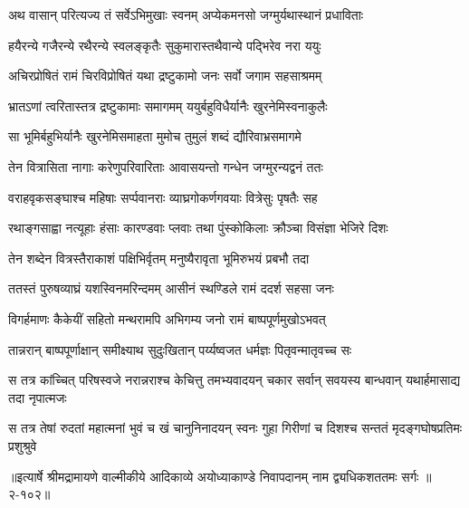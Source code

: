 \twolineshloka
{अथ वासान् परित्यज्य तं सर्वेऽभिमुखाः स्वनम्}
{अप्येकमनसो जग्मुर्यथास्थानं प्रधाविताः} %

\twolineshloka
{हयैरन्ये गजैरन्ये रथैरन्ये स्वलङ्कृतैः}
{सुकुमारास्तथैवान्ये पद्भिरेव नरा ययुः} %

\twolineshloka
{अचिरप्रोषितं रामं चिरविप्रोषितं यथा}
{द्रष्टुकामो जनः सर्वो जगाम सहसाश्रमम्} %

\twolineshloka
{भ्रातऽणां त्वरितास्तत्र द्रष्टुकामाः समागमम्}
{ययुर्बहुविधैर्यानैः खुरनेमिस्वनाकुलैः} %

\twolineshloka
{सा भूमिर्बहुभिर्यानैः खुरनेमिसमाहता}
{मुमोच तुमुलं शब्दं द्यौरिवाभ्रसमागमे} %

\twolineshloka
{तेन वित्रासिता नागाः करेणुपरिवारिताः}
{आवासयन्तो गन्धेन जग्मुरन्यद्वनं ततः} %

\twolineshloka
{वराहवृकसङ्घाश्च महिषाः सर्प्पवानराः}
{व्याघ्रगोकर्णगवयाः वित्रेसुः पृषतैः सह} %

\twolineshloka
{रथाङ्गसाह्वा नत्यूहाः हंसाः कारण्डवाः प्लवाः}
{तथा पुंस्कोकिलाः क्रौञ्चा विसंज्ञा भेजिरे दिशः} %

\twolineshloka
{तेन शब्देन वित्रस्तैराकाशं पक्षिभिर्वृतम्}
{मनुष्यैरावृता भूमिरुभयं प्रबभौ तदा} %

\twolineshloka
{ततस्तं पुरुषव्याघ्रं यशस्विनमरिन्दमम्}
{आसीनं स्थण्डिले रामं ददर्श सहसा जनः} %

\twolineshloka
{विगर्हमाणः कैकेयीं सहितो मन्थरामपि}
{अभिगम्य जनो रामं बाष्पपूर्णमुखोऽभवत्} %

\twolineshloka
{तान्नरान् बाष्पपूर्णाक्षान् समीक्ष्याथ सुदुःखितान्}
{पर्य्यष्वजत धर्मज्ञः पितृवन्मातृवच्च सः} %

\twolineshloka
{स तत्र कांच्चित् परिषस्वजे नरान्नराश्च केचित्तु तमभ्यवादयन्}
{चकार सर्वान् सवयस्य बान्धवान् यथार्हमासाद्य तदा नृपात्मजः} %

\twolineshloka
{स तत्र तेषां रुदतां महात्मनां भुवं च खं चानुनिनादयन् स्वनः}
{गुहा गिरीणां च दिशश्च सन्ततं मृदङ्गघोषप्रतिमः प्रशुश्रुवे} %


॥इत्यार्षे श्रीमद्रामायणे वाल्मीकीये आदिकाव्ये अयोध्याकाण्डे निवापदानम् नाम द्व्यधिकशततमः सर्गः ॥२-१०२॥
